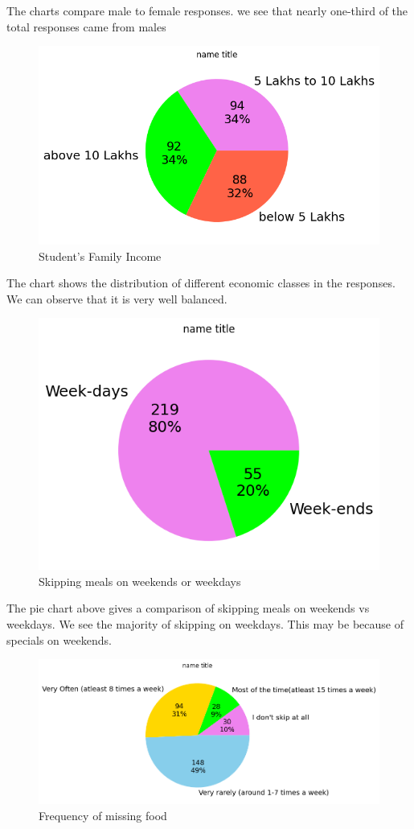 \documentclass{article}
\begin{document}
The charts compare male to female responses. we see that nearly one-third of the total responses came from males
\begin{figure}[H]
    \centering
    \includegraphics[scale = 0.9]{pie_income.png}
    \caption{Student's Family Income}  
    \label{Normality_plot}
\end{figure}
The chart shows the distribution of different economic classes in the responses. We can observe that it is very well balanced.
\begin{figure}[H]
    \centering
    \includegraphics[scale = 0.9]{pie_plot_weekdays.png}
    \caption{Skipping meals on weekends or weekdays}  
    \label{Normality_plot}
\end{figure}
The pie chart above gives a comparison of skipping meals on weekends vs weekdays. We see the majority of skipping on weekdays. This may be because of specials on weekends.
\begin{figure}[H]
    \centering
    \includegraphics[scale = 0.75]{pie_skip_categoty.png}
    \caption{Frequency of missing food}  
    \label{Normality_plot}
\end{figure}
\end{document}
